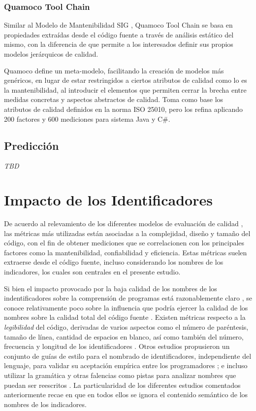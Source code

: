 \subsubsection{Quamoco Tool Chain}

Similar al Modelo de Mantenibilidad SIG \cite{Heitlager2007}, Quamoco Tool Chain \cite{Wagner2012}
se basa en propiedades extraídas desde el código fuente a través de análisis estático del mismo,
con la diferencia de que permite a los interesados definir sus propios modelos jerárquicos
de calidad.

Quamoco define un meta-modelo, facilitando la creación de modelos más genéricos, en lugar de
estar restringidos a ciertos atributos de calidad como lo es la mantenibilidad, al introducir
el elementos que permiten cerrar la brecha entre medidas concretas y aspectos abstractos de
calidad.
Toma como base los atributos de calidad definidos en la norma ISO 25010, pero los refina
aplicando 200 factores y 600 mediciones para sistema Java y C\#.

\subsection{Predicción}

\textit{TBD}

\section{Impacto de los Identificadores}

De acuerdo al relevamiento de los diferentes modelos de evaluación de calidad \cite{Yan2019},
las métricas más utilizadas están asociadas a la complejidad, diseño y tamaño del código,
con el fin de obtener mediciones que se correlacionen con los principales factores como la
mantenibilidad, confiabilidad y eficiencia.
Estas métricas suelen extraerse desde el código fuente, incluso considerando los nombres de los
indicadores, los cuales son centrales en el presente estudio.

Si bien el impacto provocado por la baja calidad de los nombres de los indentificadores sobre
la comprensión de programas está razonablemente claro \cite{DeiBenbockPizka05,Lawrie2007,Lawrie2006},
se conoce relativamente poco sobre la influencia que podría ejercer la calidad de los nombres
sobre la calidad total del código fuente \cite{ButlerWemelingerYu10}.
Existen métricas respecto a la \textit{legibilidad} del código, derivadas de varios aspectos como el
número de paréntesis, tamaño de línea, cantidad de espacios en blanco, así como también del
número, frecuencia y longitud de los identificadores \cite{Buse2008}.
Otros estudios propusieron un conjunto de guías de estilo para el nombrado
de identificadores, independiente del lenguaje, para validar su aceptación empírica entre los
programadores \cite{Relf2005}; e incluso utilizar la gramática y otras falencias como pistas para
analizar nombres que puedan ser reescritos \cite{Abebe2009}.
La particularidad de los diferentes estudios comentados anteriormente recae en que
en todos ellos se ignora el contenido semántico de los nombres de los indicadores.

